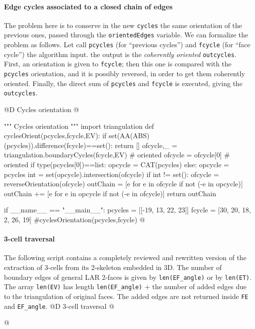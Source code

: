 \documentclass[11pt,oneside]{article}    %
\begin{document}
\paragraph{Edge cycles associated to a closed chain of edges}

The problem here is to conserve in the new \texttt{cycles} the same orientation of the previous ones,
passed through the \texttt{orientedEdges} variable. We can formalize the problem as follows. Let call \texttt{pcycles} (for ``previous cycles'') and \texttt{fcycle} (for ``face cycle'') the algorithm input. the output is the \emph{coherently oriented} \texttt{outcycles}. First, an orientation is given to \texttt{fcycle}; then this one is compared with the \texttt{pcycles} orientation, and it is possibly reversed, in order to get them coherently oriented. Finally, the direct sum of \texttt{pcycles} and \texttt{fcycle} is executed, giving the \texttt{outcycles}.

@D Cycles orientation
@{""" Cycles orientation """
import triangulation
def cyclesOrient(pcycles,fcycle,EV):
    if set(AA(ABS)(pcycles)).difference(fcycle)==set(): return []
    ofcycle,_ = triangulation.boundaryCycles(fcycle,EV) # oriented 
    ofcycle = ofcycle[0] # oriented 
    if type(pcycles[0])==list: opcycle = CAT(pcycles)
    else: opcycle = pcycles
    int = set(opcycle).intersection(ofcycle)
    if int != set(): 
        ofcycle = reverseOrientation(ofcycle)
    outChain = [e for e in ofcycle if not (-e in opcycle)] 
    outChain += [e for e in opcycle if not (-e in ofcycle)] 
    return outChain

if __name__ == "__main__":
    pcycles = [[-19, 13, 22, 23]]
    fcycle = [30, 20, 18, 2, 26, 19]
    #cyclesOrientation(pcycles,fcycle)
@}

\paragraph{3-cell traversal}
The following script contains a completely reviewed and rewritten version of the extraction of 3-cells from its 2-skeleton embedded in 3D. The number of boundary edges of general LAR 2-faces is given by \texttt{len(EF\_angle)} or by \texttt{len(ET)}. The array \texttt{len(EV)} has length \texttt{len(EF\_angle)} + the number of added edges due to the triangulation of original faces. The added edges are not returned inside \texttt{FE} and \texttt{EF\_angle}.
@D 3-cell traversal
@{

@}
\end{document}
